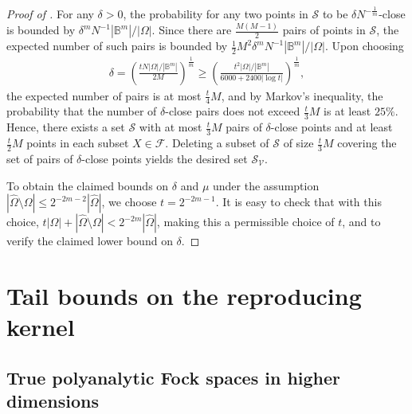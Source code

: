 \documentclass[11pt]{amsart}
\begin{document}
\begin{proof}[Proof of ]
    For any $\delta > 0$, the probability for any two points in $\mathcal S$ to be $\delta N^{-\frac{1}{m}}$-close is bounded by $ \delta^{m} N^{-1} |\mathbb B^{m}|/ |\Omega|$. Since there are $\frac{M(M-1)}{2}$ pairs of points in $\mathcal S$, the expected number of such pairs is bounded by $\frac12 M^2 \delta^{m} N^{-1} |\mathbb B^{m}| / |\Omega|$. Upon choosing
    \begin{align*}
        \delta = \left( \frac{tN |\Omega|/|\mathbb B^{m}|}{2M} \right)^{\frac1{m}} \geq \left( \frac{t^2 |\Omega|/|\mathbb B^{m}|}{6000+2400 |\log t|} \right)^{\frac1{m}},
    \end{align*}
    the expected number of pairs is at most $\frac{t}{4}M$, and by Markov's inequality, the probability that the number of $\delta$-close pairs does not exceed $\frac t3 M$ is at least $25\%$. Hence, there exists a set $\mathcal S$ with at most $\frac t3 M$ pairs of $\delta$-close points and at least $\frac t2 M$ points in each subset $X \in \mathcal F$. Deleting a subset of $\mathcal S$ of size $\frac t3 M$ covering the set of pairs of $\delta$-close points yields the desired set $\mathcal S_{\mathscr V}$.

    To obtain the claimed bounds on $\delta$ and $\mu$ under the assumption $|\hat \Omega \setminus \Omega| \leq 2^{-2m-2} |\hat \Omega|$, we choose $t = 2^{-2m-1}$. It is easy to check that with this choice, $t|\Omega| + |\hat \Omega \setminus \Omega| < 2^{-2m} |\hat \Omega|$, making this a permissible choice of $t$, and to verify the claimed lower bound on $\delta$.
\end{proof}

\section{Tail bounds on the reproducing kernel}\label{sec:tails}

\subsection{True polyanalytic Fock spaces in higher dimensions}
\end{document}
